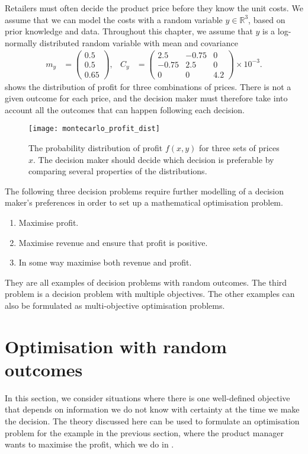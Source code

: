 \documentclass[main.tex]{subfiles}
\begin{document}
Retailers must often decide the product price before they know the
unit costs. We assume that we can model the costs with a random
variable $y\in\mathbb{R}^3$, based on prior knowledge and data.
Throughout this chapter, we  assume that $y$ is a log-normally
distributed random variable with mean and covariance
\begin{align}
  m_y
  &= \begin{pmatrix}0.5\\0.5\\0.65
  \end{pmatrix},
  &C_y
  &=\begin{pmatrix}
    2.5&-0.75&0\\
    -0.75&2.5&0\\
    0&0&4.2
  \end{pmatrix}
         \times 10^{-3}.
\end{align}
 shows the distribution of
profit for three combinations of prices. There is not a given outcome
for each price, and the decision maker must therefore take into
account all the outcomes that can happen following each decision.
\begin{figure}[htb]
  \centering
  \texttt{[image: montecarlo\_profit\_dist]}
  \caption[Probability distribution of profit.]{The probability distribution of profit $f(x,y)$ for three
    sets of prices $x$.
    The decision maker should decide which decision is preferable by comparing
    several properties of the distributions.
  }\label{fig:example_profit_distributions}
\end{figure}

The following three decision problems require further modelling of a
decision maker's preferences in order to set up a mathematical
optimisation problem.
\begin{enumerate}
\item Maximise profit.
\item Maximise revenue and ensure that profit is positive.
\item In some way maximise both revenue and profit.
\end{enumerate}
They are all examples of decision problems with random outcomes.
The third problem is a decision problem with
multiple objectives. The other examples can also be
formulated as multi-objective optimisation problems.

\section{Optimisation with random outcomes}\label{sec:one_optim_random_outcomes}
In this section, we consider situations where there is one
well-defined objective that depends on  information we do not know
with certainty at the time we make the decision.
The theory discussed here can be used to formulate an optimisation problem
for the example in the previous section, where the product manager
wants to maximise the profit, which we do in
.
\end{document}
